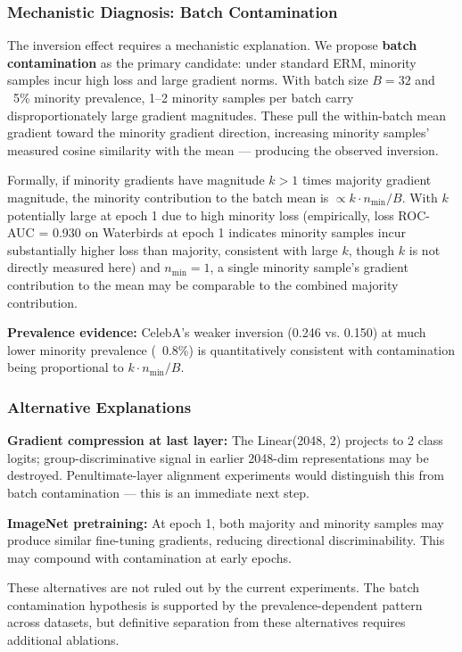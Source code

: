 
\subsubsection{Mechanistic Diagnosis: Batch Contamination}

The inversion effect requires a mechanistic explanation. We propose \textbf{batch contamination} as the primary candidate: under standard ERM, minority samples incur high loss and large gradient norms. With batch size $B=32$ and ~5\% minority prevalence, 1--2 minority samples per batch carry disproportionately large gradient magnitudes. These pull the within-batch mean gradient toward the minority gradient direction, increasing minority samples' measured cosine similarity with the mean --- producing the observed inversion.

Formally, if minority gradients have magnitude $k > 1$ times majority gradient magnitude, the minority contribution to the batch mean is $\propto k \cdot n_\text{min} / B$. With $k$ potentially large at epoch 1 due to high minority loss (empirically, loss ROC-AUC = 0.930 on Waterbirds at epoch 1 indicates minority samples incur substantially higher loss than majority, consistent with large $k$, though $k$ is not directly measured here) and $n_\text{min} = 1$, a single minority sample's gradient contribution to the mean may be comparable to the combined majority contribution.

\textbf{Prevalence evidence:} CelebA's weaker inversion (0.246 vs. 0.150) at much lower minority prevalence (~0.8\%) is quantitatively consistent with contamination being proportional to $k \cdot n_\text{min} / B$.

\subsubsection{Alternative Explanations}

\textbf{Gradient compression at last layer:} The Linear(2048, 2) projects to 2 class logits; group-discriminative signal in earlier 2048-dim representations may be destroyed. Penultimate-layer alignment experiments would distinguish this from batch contamination --- this is an immediate next step.

\textbf{ImageNet pretraining:} At epoch 1, both majority and minority samples may produce similar fine-tuning gradients, reducing directional discriminability. This may compound with contamination at early epochs.

These alternatives are not ruled out by the current experiments. The batch contamination hypothesis is supported by the prevalence-dependent pattern across datasets, but definitive separation from these alternatives requires additional ablations.

